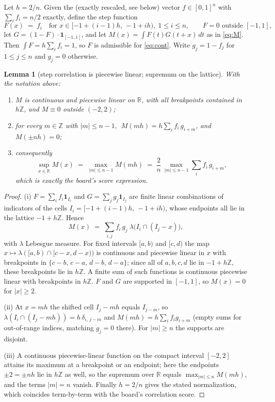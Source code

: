 \documentclass[11pt]{article}
\newtheorem{lemma}[theorem]{Lemma}
\theoremstyle{remark}
\newcommand{\RR}{\mathbb{R}}
\newcommand{\ZZ}{\mathbb{Z}}
\begin{document}
Let $h = 2/n$. Given the (exactly rescaled, see below) vector
$f \in [0,1]^n$ with $\sum_i f_i = n/2$ exactly, define the step function
\[
F(x) \;=\; f_i \quad\text{for } x \in [-1 + (i-1)h,\, -1 + ih), \; 1 \le i
\le n, \qquad F = 0 \text{ outside } [-1,1],
\]
let $G = (1 - F)\cdot\mathbf{1}_{[-1,1]}$, and let $M(x) = \int F(t) G(t+x)\,
dt$ as in \eqref{eq:M}. Then $\int F = h \sum_i f_i = 1$, so $F$ is
admissible for \eqref{eq:cont}. Write $g_j = 1 - f_j$ for $1 \le j \le n$ and
$g_j = 0$ otherwise.

\begin{lemma}[step correlation is piecewise linear; supremum on the lattice]
\label{lem:pwlinear}
With the notation above:
\begin{enumerate}
\item[(i)] $M$ is continuous and piecewise linear on $\RR$, with all
breakpoints contained in $h\ZZ$, and $M \equiv 0$ outside $(-2,2)$;
\item[(ii)] for every $m \in \ZZ$ with $|m| \le n-1$,
$\;M(mh) = h \sum_{i} f_i\, g_{i+m}$, and $M(\pm nh) = 0$;
\item[(iii)] consequently
\[
\sup_{x\in\RR} M(x) \;=\; \max_{|m| \le n-1} M(mh)
\;=\; \frac{2}{n}\,\max_{|m|\le n-1} \sum_i f_i\, g_{i+m},
\]
which is exactly the board's score expression.
\end{enumerate}
\end{lemma}

\begin{proof}
(i) $F = \sum_i f_i \mathbf{1}_{I_i}$ and $G = \sum_j g_j \mathbf{1}_{I_j}$
are finite linear combinations of indicators of the cells
$I_i = [-1+(i-1)h,\, -1+ih)$, whose endpoints all lie in the lattice
$-1 + h\ZZ$. Hence
\[
M(x) \;=\; \sum_{i,j} f_i\, g_j\; \lambda\!\bigl(I_i \cap (I_j - x)\bigr),
\]
with $\lambda$ Lebesgue measure. For fixed intervals $[a,b)$ and $[c,d)$ the
map $x \mapsto \lambda([a,b) \cap [c-x, d-x))$ is continuous and piecewise
linear in $x$ with breakpoints in $\{c-b,\, c-a,\, d-b,\, d-a\}$; since all
of $a,b,c,d$ lie in $-1+h\ZZ$, these breakpoints lie in $h\ZZ$. A finite sum
of such functions is continuous piecewise linear with breakpoints in $h\ZZ$.
$F$ and $G$ are supported in $[-1,1]$, so $M(x) = 0$ for $|x| \ge 2$.

(ii) At $x = mh$ the shifted cell $I_j - mh$ equals $I_{j-m}$, so
$\lambda(I_i \cap (I_j - mh)) = h\,\delta_{i,\,j-m}$ and
$M(mh) = h\sum_i f_i g_{i+m}$ (empty sums for out-of-range indices, matching
$g_j = 0$ there). For $|m| \ge n$ the supports are disjoint.

(iii) A continuous piecewise-linear function on the compact interval
$[-2,2]$ attains its maximum at a breakpoint or an endpoint; here the
endpoints $\pm 2 = \pm nh$ lie in $h\ZZ$ as well, so the supremum over $\RR$
equals $\max_{|m| \le n} M(mh)$, and the terms $|m| = n$ vanish. Finally
$h = 2/n$ gives the stated normalization, which coincides term-by-term with
the board's correlation score.
\end{proof}
\end{document}
